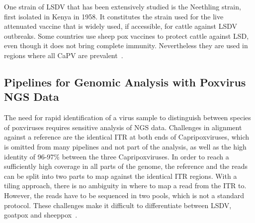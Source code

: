 One strain of LSDV that has been extensively studied is the Neethling strain, first isolated in Kenya in 1958. It constitutes the strain used for the live attenuated vaccine that is widely used, if accessible, for cattle against LSDV outbreaks. Some countries use sheep pox vaccines to protect cattle against LSD, even though it does not bring complete immunity. Nevertheless they are used in regions where all CaPV are prevalent~\cite{brenner2009appearance}.

\subsection{Pipelines for Genomic Analysis with Poxvirus NGS Data}
The need for rapid identification of a virus sample to distinguish between species of poxviruses requires sensitive analysis of NGS data. Challenges in alignment against a reference are the identical ITR at both ends of Capripoxviruses, which is omitted from many pipelines and not part of the analysis, as well as the high identity of 96-97\% between the three Capripoxviruses. In order to reach a sufficiently high coverage in all parts of the genome, the reference and the reads can be split into two parts to map against the identical ITR regions. With a tiling approach, there is no ambiguity in where to map a read from the ITR to. However, the reads have to be sequenced in two pools, which is not a standard protocol. These challenges make it difficult to differentiate between LSDV, goatpox and sheeppox~\cite{tulman2001genome}.

